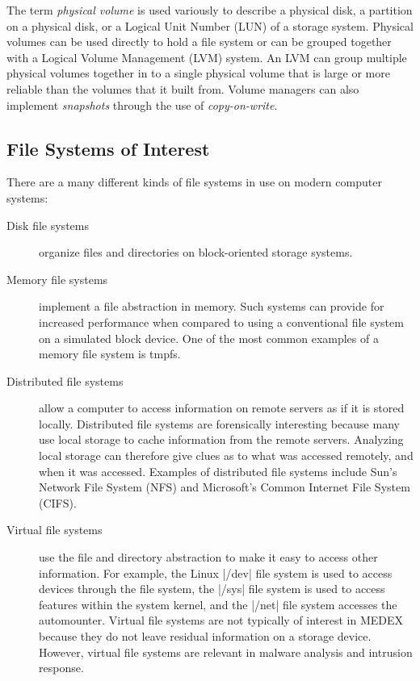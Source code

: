 The term \emph{physical volume} is used variously to describe a
physical disk, a partition on a physical disk, or a Logical Unit
Number (LUN) of a storage system.  Physical volumes can be used
directly to hold a file system or can be grouped together with a
Logical Volume Management (LVM) system. An LVM can group multiple
physical volumes together in to a single physical volume that is large
or more reliable than the volumes that it built from. Volume managers
can also implement \emph{snapshots} through the use of
\emph{copy-on-write}.

\subsection{File Systems of Interest}
There are a many different kinds of file systems in use on
modern computer systems:
\begin{description}
\item[Disk file systems] organize files and directories on
  block-oriented storage systems. 
\item[Memory file systems] implement a file abstraction in
  memory. Such systems can provide for increased performance when
  compared to using a conventional file system on a simulated block
  device. One of the most common examples of a memory file system is tmpfs\cite{Synder90tmpfs:a}.
\item[Distributed file systems] allow a computer to access
  information on remote servers as if it is stored
  locally. Distributed file systems are forensically interesting
  because many use local storage to cache information from the remote
  servers. Analyzing local storage can therefore give clues as to what
  was accessed remotely, and when it was accessed. Examples of
  distributed file systems include Sun's Network File System
  (NFS)\cite{Sandberg85designand,Pawlowski00thenfs} and Microsoft's
  Common Internet File System (CIFS)\cite{ms-cifs}.
\item[Virtual file systems] use the file and directory abstraction to
  make it easy to access other information. For example, the Linux
  |/dev| file system is used to access devices through the file
  system, the |/sys| file system is used to access features within
  the system kernel, and the |/net| file system accesses the
  automounter. Virtual file systems are not typically of interest in
  MEDEX because they do not leave residual information on a storage
  device. However, virtual file systems are relevant in malware
  analysis and intrusion response.
\end{description}

